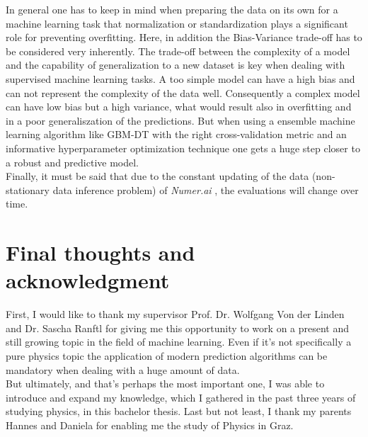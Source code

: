\documentclass[12pt, a4paper]{article}
\begin{document}
In general one has to keep in mind when preparing the data on its own for a machine learning task that normalization or standardization plays a significant role for preventing overfitting. Here, in addition the Bias-Variance trade-off has to be considered very inherently. The trade-off between the complexity of a model and the capability of generalization to a new dataset is key when dealing with supervised machine learning tasks. A too simple model can have a high bias and can not represent the complexity of the data well. Consequently a complex model can have low bias but a high variance, what would result also in overfitting and in a poor generaliszation of the predictions. But when using a ensemble machine learning algorithm like GBM-DT with the right cross-validation metric and an informative hyperparameter optimization technique one gets a huge step closer to a robust and predictive model. \\
Finally, it must be said that due to the constant updating of the data (non-stationary data inference problem) of \textit{Numer.ai} \cite{Numerai}, the evaluations will change over time.
\section{Final thoughts and acknowledgment}
First, I would like to thank my supervisor Prof. Dr. Wolfgang Von der Linden and Dr. Sascha Ranftl for giving me this opportunity to work on a present and still growing topic in the field of machine learning. Even if it's not specifically a pure physics topic the application of modern prediction algorithms can be mandatory when dealing with a huge amount of data. \\
But ultimately, and that's perhaps the most important one, I was able to
introduce and expand my knowledge, which I gathered in the past three years of studying physics, in this bachelor thesis. Last but not least, I thank my parents Hannes and Daniela for enabling me the study of Physics in Graz.
\newpage
\printbibliography
\newpage
\listoffigures
\end{document}
